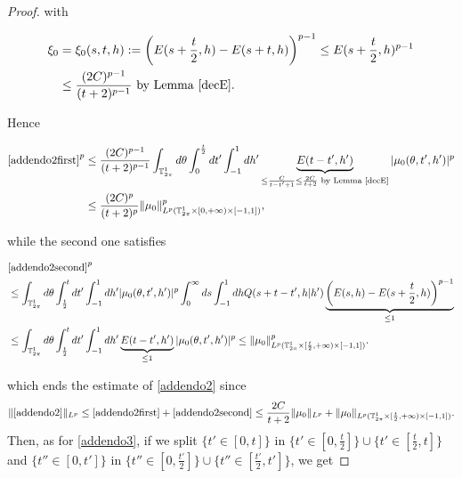 \documentclass[a4paper,10pt,reqno]{amsart}
\numberwithin{equation}{subsection}
\numberwithin{figure}{subsection}
\begin{document}
\begin{proof}
with

\begin{align*}
\xi_0&=\xi_0(s,t,h):=\left(E(s+\frac{t}{2},h)-E(s+t,h)\right)^{p-1}\leq E(s+\frac{t}{2},h)^{p-1}
\\
&\leq\frac{(2C)^{p-1}}{(t+2)^{p-1}}\textrm{ by Lemma \ref{decE}}.
\end{align*}

Hence

{\small\begin{align*}\eqref{addendo2first}^p&\leq\frac{(2C)^{p-1}}{(t+2)^{p-1}}\int_{\mathbb{T}^1_{2\pi}}d\theta\int_0^{\frac{t}{2}}dt'\int_{-1}^1dh'\underbrace{E(t-t',h')}_{\leq\frac{C}{t-t'+1}\leq\frac{2C}{t+2}\textrm{ by Lemma \ref{decE}}}|\mu_0(\theta,{t'},h')|^p
\\
&\leq\frac{(2C)^p}{(t+2)^p}\|\mu_0\|_{L^p(\mathbb{T}^1_{2\pi}\times[0,+\infty)\times[-1,1])}^p,
\end{align*}}

while the second one satisfies

{\tiny\begin{align*}
&\eqref{addendo2second}^p
\\
&\leq\int_{\mathbb{T}^1_{2\pi}}d\theta\int_{\frac{t}{2}}^tdt'\int_{-1}^1dh'|\mu_0(\theta,t',h')|^p\int_0^{\infty}ds\int_{-1}^1dhQ(s+t-t',h|h')\underbrace{\left(E(s,h)-E(s+\frac{t}{2},h)\right)^{p-1}}_{\leq1}
\\
&\leq\int_{\mathbb{T}^1_{2\pi}}d\theta\int_{\frac{t}{2}}^tdt'\int_{-1}^1dh'\underbrace{E(t-t',h')}_{\leq1}|\mu_0(\theta,{t'},h')|^p\leq\|\mu_0\|_{L^p(\mathbb{T}^1_{2\pi}\times[\frac{t}{2},+\infty)\times[-1,1])}^p.
\end{align*}}

which ends the estimate of \eqref{addendo2} since
\[
\|\eqref{addendo2}\|_{L^p}\leq\eqref{addendo2first}+\eqref{addendo2second}\leq\frac{2C}{t+2}\|\mu_0\|_{L^p}+\|\mu_0\|_{L^p(\mathbb{T}^1_{2\pi}\times[\frac{t}{2},+\infty)\times[-1,1])}.
\]
Then, as for \eqref{addendo3}, if we split $\{t'\in[0,t]\}$ in $\{t'\in[0,\frac{t}{2}]\}\cup\{t'\in[\frac{t}{2},t]\}$ and $\{t''\in[0,t']\}$ in $\{t''\in[0,\frac{t'}{2}]\}\cup\{t''\in[\frac{t'}{2},t']\}$, we get


\end{proof}
\end{document}
